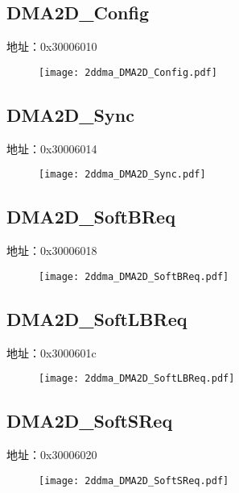\subsection{DMA2D\_Config}
\label{2ddma-DMA2D-Config}
地址：0x30006010
 \begin{figure}[H]
\texttt{[image: 2ddma\_DMA2D\_Config.pdf]}
\end{figure}

\subsection{DMA2D\_Sync}
\label{2ddma-DMA2D-Sync}
地址：0x30006014
 \begin{figure}[H]
\texttt{[image: 2ddma\_DMA2D\_Sync.pdf]}
\end{figure}

\subsection{DMA2D\_SoftBReq}
\label{2ddma-DMA2D-SoftBReq}
地址：0x30006018
 \begin{figure}[H]
\texttt{[image: 2ddma\_DMA2D\_SoftBReq.pdf]}
\end{figure}

\subsection{DMA2D\_SoftLBReq}
\label{2ddma-DMA2D-SoftLBReq}
地址：0x3000601c
 \begin{figure}[H]
\texttt{[image: 2ddma\_DMA2D\_SoftLBReq.pdf]}
\end{figure}

\subsection{DMA2D\_SoftSReq}
\label{2ddma-DMA2D-SoftSReq}
地址：0x30006020
 \begin{figure}[H]
\texttt{[image: 2ddma\_DMA2D\_SoftSReq.pdf]}
\end{figure}

